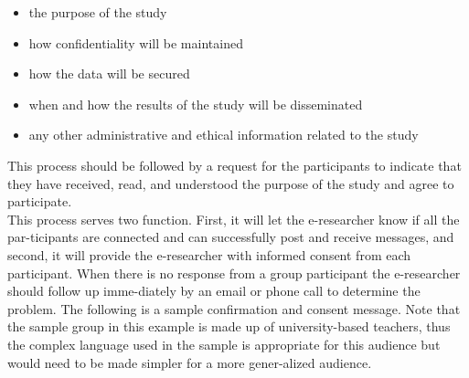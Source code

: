 \documentclass[a4,9pt]{beamer}
\begin{document}
\begin{frame}
\begin{itemize}
  \item the purpose of the study\\
  \item how confidentiality will be maintained\\
  \item how the data will be secured\\
  \item when and how the results of the study will be disseminated \\
  \item any other administrative and ethical information related to the study \\
\end{itemize}

\vspace*{0.3cm}
This process should be followed by a request for the participants to indicate that they have received, read, and understood the purpose of the study and agree to participate.\\ This process serves two function. First, it will let the e-researcher know if all the par-ticipants are connected and can successfully post and receive messages, and second, it will provide the e-researcher with informed consent from each participant. When there is no response from a group participant the e-researcher should follow up imme-diately by an email or phone call to determine the problem. The following is a sample confirmation and consent message. Note that the sample group in this example is made up of university-based teachers, thus the complex language used in the sample is appropriate for this audience but would need to be made simpler for a more gener-alized audience.\\

\vspace*{0.2cm}
\end{frame}
\end{document}
